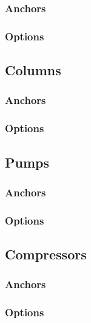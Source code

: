 \documentclass[a4paper, twoside]{article}
\begin{document}
        \subsubsection{Anchors}
            

        \subsubsection{Options}
            

    \subsection{Columns}
        \subsubsection{Anchors}
            

        \subsubsection{Options}
            

    \subsection{Pumps}
        \subsubsection{Anchors}
            

        \subsubsection{Options}
            

    \subsection{Compressors}
        \subsubsection{Anchors}
            

        \subsubsection{Options}
            
\end{document}
